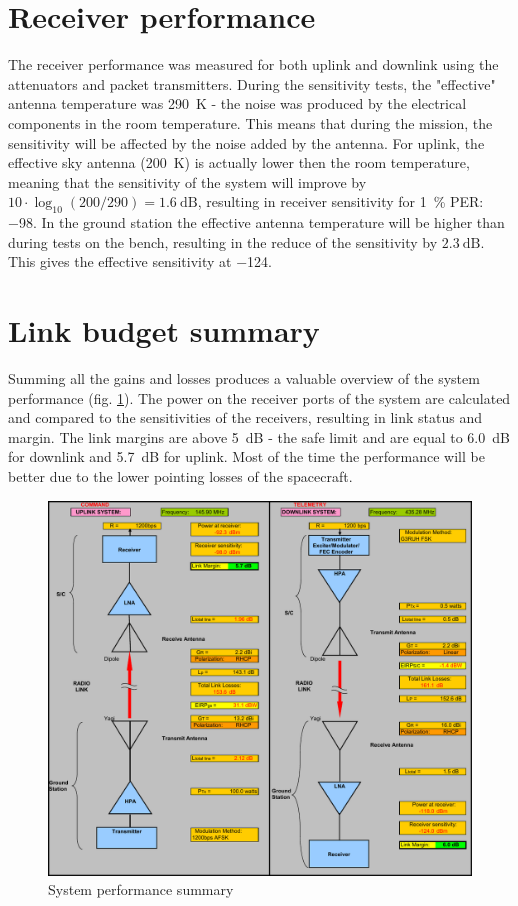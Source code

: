 \section{Receiver performance}
The receiver performance was measured for both uplink and downlink using the attenuators and packet transmitters. During the sensitivity tests, the "effective" antenna temperature was \SI{290}{\kelvin} - the noise was produced by the electrical components in the room temperature. This means that during the mission, the sensitivity will be affected by the noise added by the antenna.
For uplink, the effective sky antenna (\SI{200}{\kelvin}) is actually lower then the room temperature, meaning that the sensitivity of the system will improve by $10\cdot \log_{10}(200/290) = \SI{1.6}{\dB}$, resulting in receiver sensitivity for \SI{1}{\percent} PER: \SI{-98}{\dBm}.
In the ground station the effective antenna temperature will be higher than during tests on the bench, resulting in the reduce of the sensitivity by $\SI{2.3}{\dB}$. This gives the effective sensitivity at \SI{-124}{\dBm}.


\section{Link budget summary}
Summing all the gains and losses produces a valuable overview of the system performance (fig. \ref{link:link_status}). The power on the receiver ports of the system are calculated and compared to the sensitivities of the receivers, resulting in link status and margin. The link margins are above \SI{5}{\dB} - the safe limit and are equal to \SI{6.0}{\dB} for downlink and \SI{5.7}{\dB} for uplink. Most of the time the performance will be better due to the lower pointing losses of the spacecraft. 

\begin{figure}
    \centering
    \includegraphics[width=0.8\paperwidth]{img/8/link_summary.pdf}
    \caption{System performance summary}
    \label{link:link_status}
\end{figure}